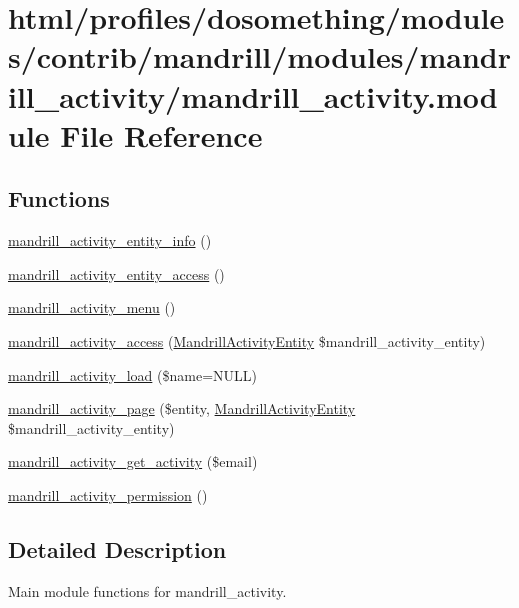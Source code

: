 \hypertarget{mandrill__activity_8module}{
\section{html/profiles/dosomething/modules/contrib/mandrill/modules/mandrill\_\-activity/mandrill\_\-activity.module File Reference}
\label{mandrill__activity_8module}
}
\subsection*{Functions}
\begin{DoxyCompactItemize}
\item 
\hyperlink{mandrill__activity_8module_a430c6465c089702cea420ce9ac46aad8}{mandrill\_\-activity\_\-entity\_\-info} ()
\item 
\hyperlink{mandrill__activity_8module_a7fbb142af8908a90e9cf33774c1a01fc}{mandrill\_\-activity\_\-entity\_\-access} ()
\item 
\hyperlink{mandrill__activity_8module_a2967e85bba4a823650a30286878d62ea}{mandrill\_\-activity\_\-menu} ()
\item 
\hyperlink{mandrill__activity_8module_a215acec4873a6eb75584109cef7e9fc6}{mandrill\_\-activity\_\-access} (\hyperlink{classMandrillActivityEntity}{MandrillActivityEntity} \$mandrill\_\-activity\_\-entity)
\item 
\hyperlink{mandrill__activity_8module_afa5dcbb883ef346e89f389138d82dda5}{mandrill\_\-activity\_\-load} (\$name=NULL)
\item 
\hyperlink{mandrill__activity_8module_a7f19a71b20f386a718df03a81e614c5b}{mandrill\_\-activity\_\-page} (\$entity, \hyperlink{classMandrillActivityEntity}{MandrillActivityEntity} \$mandrill\_\-activity\_\-entity)
\item 
\hyperlink{mandrill__activity_8module_a9703602184d50379b683cb3d63e8bf85}{mandrill\_\-activity\_\-get\_\-activity} (\$email)
\item 
\hyperlink{mandrill__activity_8module_ae472153f930f2f774f26ae80f5b54eba}{mandrill\_\-activity\_\-permission} ()
\end{DoxyCompactItemize}


\subsection{Detailed Description}
Main module functions for mandrill\_\-activity. 

